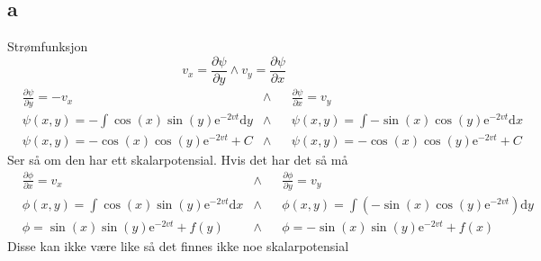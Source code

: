 \documentclass[a4paper,10pt,norsk]{article}
\newcommand{\dd}[1]{\mathrm{d}#1}
\begin{document}
	\subsection*{a}
		Strømfunksjon \[
		v_x = \frac{\partial \psi}{\partial y}  \wedge v_y = \frac{\partial \psi}{\partial x} 
		\] 
		\begin{align*}
			& \frac{\partial \psi}{\partial y} = -v_x
			& \wedge &
			& \frac{\partial \psi}{\partial x} = v_y\\
			& \psi (x,y) = - \int \cos(x) \sin(y) \mathrm{e} ^{-2vt} \dd{y}
			& \wedge &
			& \psi (x,y) = \int -\sin(x) \cos(y) \mathrm{e}^{-2vt} \dd{x}\\
			& \psi (x,y) = - \cos(x) \cos(y)  \mathrm{e}^{-2vt} + C
			& \wedge &
			& \psi (x,y) = - \cos(x) \cos(y)  \mathrm{e}^{-2vt} + C
		\end{align*}
		Ser så om den har ett skalarpotensial. Hvis det har det så må 
		\begin{align*}
			&\frac{\partial \phi}{\partial x} = v_x 
			&\wedge & 
			&\frac{\partial \phi}{\partial y} = v_y \\
			& \phi(x,y) = \int \cos(x) \sin(y) \mathrm{e}^{-2vt} \dd{x}
			& \wedge &
			& \phi(x,y) = \int \left( -\sin(x) \cos(y) \mathrm{e}^{-2vt} \right) \dd{y}\\
			& \phi = \sin(x) \sin(y) \mathrm{e}^{-2vt} + f(y)
			& \wedge &
			& \phi = - \sin(x) \sin(y) \mathrm{e}^{-2vt} + f(x)
		\end{align*}
		Disse kan ikke være like så det finnes ikke noe skalarpotensial
	
\end{document}
